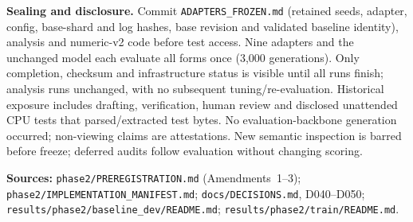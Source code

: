 \noindent\textbf{Sealing and disclosure.} Commit \texttt{ADAPTERS\_FROZEN.md} (retained seeds, adapter, config, base-shard and log hashes, base revision and validated baseline identity), analysis and numeric-v2 code before test access. Nine adapters and the unchanged model each evaluate all forms once (3,000 generations). Only completion, checksum and infrastructure status is visible until all runs finish; analysis runs unchanged, with no subsequent tuning/re-evaluation. Historical exposure includes drafting, verification, human review and disclosed unattended CPU tests that parsed/extracted test bytes. No evaluation-backbone generation occurred; non-viewing claims are attestations. New semantic inspection is barred before freeze; deferred audits follow evaluation without changing scoring. 

\begingroup\small\singlespacing
\noindent\textbf{Sources:} \nolinkurl{phase2/PREREGISTRATION.md} (Amendments~1--3); \nolinkurl{phase2/IMPLEMENTATION_MANIFEST.md}; \nolinkurl{docs/DECISIONS.md}, D040--D050; \nolinkurl{results/phase2/baseline_dev/README.md}; \nolinkurl{results/phase2/train/README.md}.\par
\endgroup
